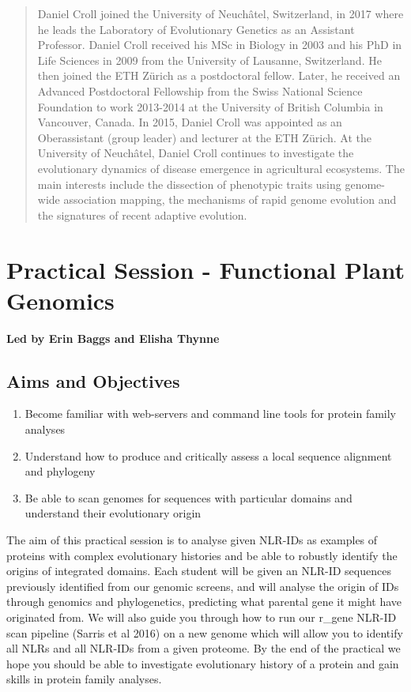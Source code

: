 \documentclass[12pt,]{book}
\providecommand{\tightlist}{%
  \setlength{\itemsep}{0pt}\setlength{\parskip}{0pt}}
\theoremstyle{definition}
\theoremstyle{definition}
\theoremstyle{remark}
\begin{document}
\begin{quote}
Daniel Croll joined the University of Neuchâtel, Switzerland, in 2017
where he leads the Laboratory of Evolutionary Genetics as an Assistant
Professor. Daniel Croll received his MSc in Biology in 2003 and his PhD
in Life Sciences in 2009 from the University of Lausanne, Switzerland.
He then joined the ETH Zürich as a postdoctoral fellow. Later, he
received an Advanced Postdoctoral Fellowship from the Swiss National
Science Foundation to work 2013-2014 at the University of British
Columbia in Vancouver, Canada. In 2015, Daniel Croll was appointed as an
Oberassistant (group leader) and lecturer at the ETH Zürich. At the
University of Neuchâtel, Daniel Croll continues to investigate the
evolutionary dynamics of disease emergence in agricultural ecosystems.
The main interests include the dissection of phenotypic traits using
genome-wide association mapping, the mechanisms of rapid genome
evolution and the signatures of recent adaptive evolution.
\end{quote}

\section*{Practical Session - Functional Plant
Genomics}\label{practical-session---functional-plant-genomics}

\textbf{Led by Erin Baggs and Elisha Thynne}

\subsection*{Aims and Objectives}\label{aims-and-objectives-5}

\begin{enumerate}
\def\labelenumi{\arabic{enumi}.}
\tightlist
\item
  Become familiar with web-servers and command line tools for protein
  family analyses
\item
  Understand how to produce and critically assess a local sequence
  alignment and phylogeny
\item
  Be able to scan genomes for sequences with particular domains and
  understand their evolutionary origin
\end{enumerate}

The aim of this practical session is to analyse given NLR-IDs as
examples of proteins with complex evolutionary histories and be able to
robustly identify the origins of integrated domains. Each student will
be given an NLR-ID sequences previously identified from our genomic
screens, and will analyse the origin of IDs through genomics and
phylogenetics, predicting what parental gene it might have originated
from. We will also guide you through how to run our r\_gene NLR-ID scan
pipeline (Sarris et al 2016) on a new genome which will allow you to
identify all NLRs and all NLR-IDs from a given proteome. By the end of
the practical we hope you should be able to investigate evolutionary
history of a protein and gain skills in protein family analyses.
\end{document}
